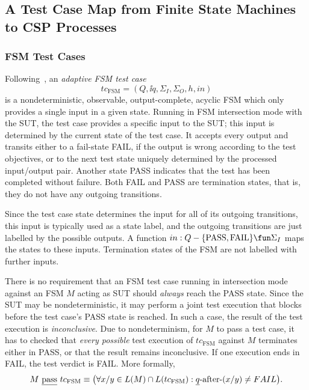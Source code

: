 \subsection{A Test Case Map from Finite State Machines to CSP Processes}
\label{sec:tcmap}

\subsubsection*{FSM Test Cases}

Following~\cite{DBLP:conf/hase/PetrenkoY14},
an \emph{adaptive FSM test case}
$$
tc_\text{FSM}=(Q,\ii q,\Sigma_I,\Sigma_O,h,in)
$$
is a nondeterministic, observable, output-complete, acyclic FSM which only provides a single input in a given state. Running in FSM intersection mode with the SUT, the test case provides a specific input to the SUT; this input is determined by the current state of the test case. It accepts every output and transits either to a fail-state FAIL, if the output is wrong according to the test objectives, or to the next test state uniquely determined  by the processed input/output pair. Another state PASS indicates that
the test has been completed without failure. Both FAIL and PASS are termination states, that is, they do not have any outgoing transitions.

Since the test case state determines the input for all of its outgoing transitions, this input is typically used as a state label, and the outgoing transitions are just labelled by the possible outputs. A function $in : Q -\{  \text{PASS}, \text{FAIL} \}
\fun\Sigma_I$ maps the states to these inputs. Termination states
of the FSM are not labelled with further inputs.

There is no requirement that an FSM test case running in intersection mode against
an FSM $M$ acting as SUT should {\it always} reach the PASS state. Since the SUT may be nondeterministic, it may perform a joint test execution that blocks before
the test case's PASS state is reached. In such a case, the result of the test execution is \emph{inconclusive}. Due to nondeterminism, for $M$ to pass a test case, it
has to checked that {\it every possible} test execution of  $tc_\text{FSM}$ against $M$
terminates either in PASS, or that the result remains inconclusive. If one execution ends in FAIL, the test verdict is FAIL. More formally,
$$
M\ \underline{\text{pass}}\ tc_\text{FSM} \equiv
\big(
\forall x/y \in L(M)\cap L(tc_\text{FSM}): \underline{q}\text{-after-}(x/y) \neq FAIL
\big).
$$

